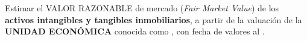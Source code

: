 Estimar el \textcolor{principal}{VALOR RAZONABLE} de mercado (\textit{Fair Market Value}) de los \textcolor{principal}{\textbf{activos intangibles y tangibles inmobiliarios}}, a partir de la valuaci\'on de la \textcolor{principal}{\textbf{UNIDAD ECON\'OMICA}} conocida como \empresaCorto, con fecha de valores al \fechaValores.